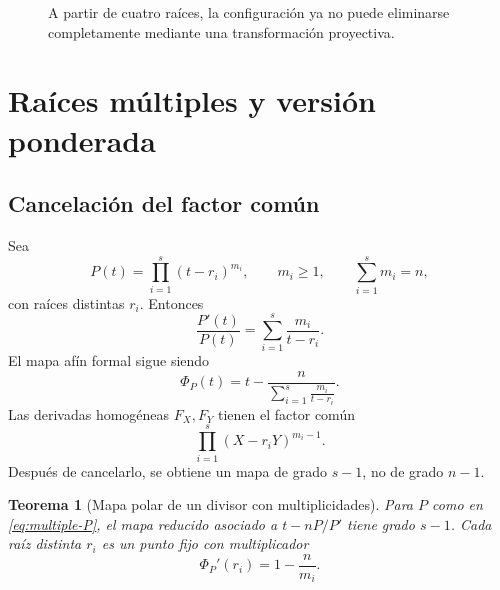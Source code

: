 \documentclass[11pt,oneside]{scrartcl}
\theoremstyle{plainblue}
\newtheorem{theorem}{Teorema}[section]
\theoremstyle{definitionblue}
\theoremstyle{remarkgray}
\begin{document}
\begin{figure}[ht]
\centering
{}
\caption{A partir de cuatro raíces, la configuración ya no puede eliminarse completamente mediante una transformación proyectiva.}
\label{fig:quartic-moduli}
\end{figure}

\section{Raíces múltiples y versión ponderada}

\subsection{Cancelación del factor común}

Sea
\begin{equation}\label{eq:multiple-P}
P(t)=\prod_{i=1}^{s}(t-r_i)^{m_i},
\qquad
m_i\ge1,
\qquad
\sum_{i=1}^{s}m_i=n,
\end{equation}
con raíces distintas \(r_i\). Entonces
\[
\frac{P'(t)}{P(t)}=\sum_{i=1}^{s}\frac{m_i}{t-r_i}.
\]
El mapa afín formal sigue siendo
\begin{equation}\label{eq:weighted-Phi}
\Phi_P(t)=t-\frac{n}{\displaystyle\sum_{i=1}^{s}\frac{m_i}{t-r_i}}.
\end{equation}
Las derivadas homogéneas \(F_X,F_Y\) tienen el factor común
\[
\prod_{i=1}^{s}(X-r_iY)^{m_i-1}.
\]
Después de cancelarlo, se obtiene un mapa de grado \(s-1\), no de grado \(n-1\).

\begin{theorem}[Mapa polar de un divisor con multiplicidades]\label{thm:weighted-map}
Para \(P\) como en \cref{eq:multiple-P}, el mapa reducido asociado a
\(t-nP/P'\) tiene grado \(s-1\). Cada raíz distinta \(r_i\) es un punto fijo con
multiplicador
\begin{equation}\label{eq:weighted-multiplier}
\boxed{\Phi_P'(r_i)=1-\frac{n}{m_i}.}
\end{equation}
\end{theorem}
\end{document}
